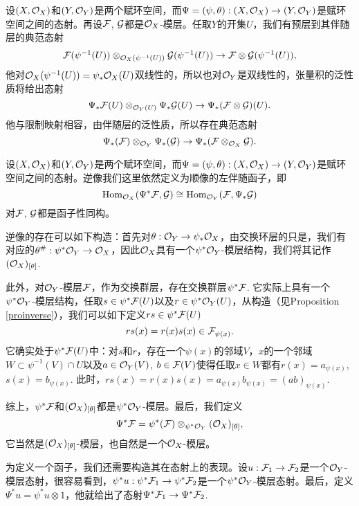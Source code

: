 \begin{para}[张量积的顺像]
设$(X,\mathcal{O}_X)$和$(Y,\mathcal{O}_Y)$是两个赋环空间，而$\Psi=(\psi,\theta):(X,\mathcal{O}_X)\to (Y,\mathcal{O}_Y)$是赋环空间之间的态射。再设$\mathcal{F}$, $\mathcal{G}$都是$\mathcal{O}_X$-模层。任取$Y$的开集$U$，我们有预层到其伴随层的典范态射
\[
	\mathcal{F}(\psi^{-1}(U))\otimes_{\mathcal{O}_X(\psi^{-1}(U))} \mathcal{G}(\psi^{-1}(U))\to \mathcal{F}\otimes \mathcal{G}(\psi^{-1}(U)),
\]
他对$\mathcal{O}_X(\psi^{-1}(U))=\psi_*\mathcal{O}_X(U)$双线性的，所以也对$\mathcal{O}_Y$是双线性的，张量积的泛性质将给出态射
\[
	\Psi_*\mathcal{F} (U)\otimes_{\mathcal{O}_Y(U)}\Psi_*\mathcal{G} (U)\to \Psi_*(\mathcal{F}\otimes \mathcal{G}) (U).
\]
他与限制映射相容，由伴随层的泛性质，所以存在典范态射
\[
	\Psi_*(\mathcal{F})\otimes_{\mathcal{O}_Y}\Psi_*(\mathcal{G}) \to \Psi_*(\mathcal{F}\otimes_{\mathcal{O}_X} \mathcal{G}).
\]
\end{para}

\begin{para}[逆像]
设$(X,\mathcal{O}_X)$和$(Y,\mathcal{O}_Y)$是两个赋环空间，而$\Psi=(\psi,\theta):(X,\mathcal{O}_X)\to (Y,\mathcal{O}_Y)$是赋环空间之间的态射。逆像我们这里依然定义为顺像的左伴随函子，即
\[
	\operatorname{Hom}_{\mathcal{O}_X}(\Psi^*\mathcal{F},\mathcal{G})\cong \operatorname{Hom}_{\mathcal{O}_Y}(\mathcal{F},\Psi_*\mathcal{G})
\]
对$\mathcal{F}$, $\mathcal{G}$都是函子性同构。

逆像的存在可以如下构造：首先对$\theta:\mathcal{O}_Y\to \psi_*\mathcal{O}_X$，由交换环层的只是，我们有对应的$\theta^\#:\psi^*\mathcal{O}_Y\to \mathcal{O}_X$，因此$\mathcal{O}_X$具有一个$\psi^*\mathcal{O}_Y$-模层结构，我们将其记作$(\mathcal{O}_X)_{[\theta]}$.

此外，对$\mathcal{O}_Y$-模层$\mathcal{F}$，作为交换群层，存在交换群层$\psi^*\mathcal{F}$. 它实际上具有一个$\psi^*\mathcal{O}_Y$-模层结构，任取$s\in \psi^*\mathcal{F}(U)$以及$r\in \psi^*\mathcal{O}_Y(U)$，从构造（见Proposition \ref{proinverse}），我们可以如下定义$rs\in \psi^*\mathcal{F}(U)$
\[
	rs(x)=r(x)s(x)\in \mathcal{F}_{\psi(x)}.
\]
它确实处于$\psi^*\mathcal{F}(U)$中：对$s$和$r$，存在一个$\psi(x)$的邻域$V$，$x$的一个邻域$W\subset \psi^{-1}(V)\cap U$以及$a\in \mathcal{O}_Y(V)$, $b\in \mathcal{F}(V)$使得任取$x\in W$都有$r(x)=a_{\psi(x)}$, $s(x)=b_{\psi(x)}$. 此时，$rs(x)=r(x)s(x)=a_{\psi(x)}b_{\psi(x)}=(ab)_{\psi(x)}$.

综上，$\psi^*\mathcal{F}$和$(\mathcal{O}_X)_{[\theta]}$都是$\psi^*\mathcal{O}_Y$-模层。最后，我们定义
\[
	\Psi^*\mathcal{F}=\psi^*(\mathcal{F})\otimes_{\psi^*\mathcal{O}_Y} (\mathcal{O}_X)_{[\theta]},
\]
它当然是$(\mathcal{O}_X)_{[\theta]}$-模层，也自然是一个$\mathcal{O}_X$-模层。

为定义一个函子，我们还需要构造其在态射上的表现。设$u:\mathcal{F}_1\to\mathcal{F}_2$是一个$\mathcal{O}_Y$-模层态射，很容易看到，$\psi^*u :\psi^*\mathcal{F}_1\to\psi^*\mathcal{F}_2$是一个$\psi^*\mathcal{O}_Y$-模层态射。最后，定义$\Psi^*u=\psi^*u\otimes 1$，他就给出了态射$\Psi^*\mathcal{F}_1\to \Psi^*\mathcal{F}_2$.
\end{para}

